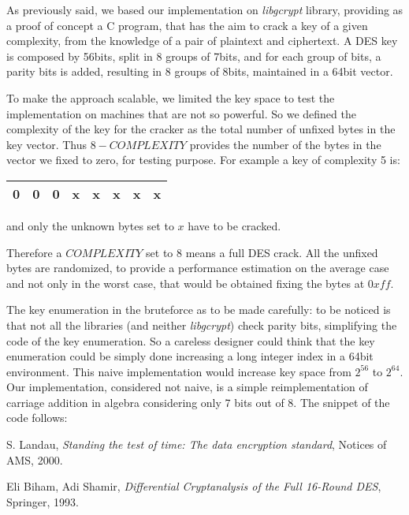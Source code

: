 \documentclass[11pt]{article}
\begin{document}
  As previously said, we based our implementation on \textit{libgcrypt} library, providing as a proof of concept a C program, that has the aim to crack a key of a given complexity, from the knowledge of a pair of plaintext and ciphertext. A DES key is composed by 56bits, split in 8 groups of 7bits, and for each group of bits, a parity bits is added, resulting in 8 groups of 8bits, maintained in a 64bit vector.

  To make the approach scalable, we limited the key space to test the implementation on machines that are not so powerful. So we defined the complexity of the key for the cracker as the total number of unfixed bytes in the key vector. Thus $8 - COMPLEXITY$ provides the number of the bytes in the vector we fixed to zero, for testing purpose.
  For example a key of complexity 5 is:
  \begin{center}
    \begin{tabular}{ | c | c | c | c | c | c | c | c |}
      \hline
      0 & 0 & 0 & x & x & x & x & x  \\
      \hline
    \end{tabular}
  \end{center}
  and only the unknown bytes set to $x$ have to be cracked.

  Therefore a $COMPLEXITY$ set to 8 means a full DES crack. All the unfixed bytes are randomized, to provide a performance estimation on the average case and not only in the worst case, that would be obtained fixing the bytes at $0xff$.

  The key enumeration in the bruteforce as to be made carefully: to be noticed is that not all the libraries (and neither \textit{libgcrypt}) check parity bits, simplifying the code of the key enumeration. So a careless designer could think that the key enumeration could be simply done increasing a long integer index in a 64bit environment. This naive implementation would increase key space from $2^{56}$ to $2^{64}$.
  Our implementation, considered not naive, is a simple reimplementation of carriage addition in algebra considering only 7 bits out of 8. The snippet of the code follows:

  


  \begin{thebibliography}{99}

      S. Landau,
      \textit{Standing the test of time: The data encryption standard},
      Notices of AMS,
      2000.

      Eli Biham, Adi Shamir,
      \textit{Differential Cryptanalysis of the Full 16-Round DES},
      Springer,
      1993.

  \end{thebibliography}
\end{document}

